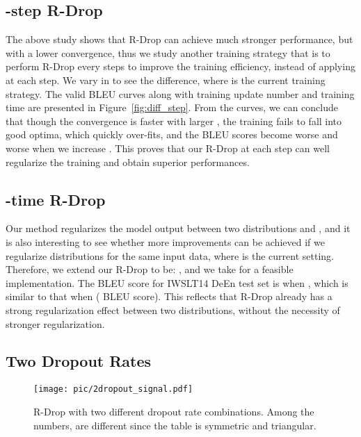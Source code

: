 \documentclass{article}
\begin{document}
\subsection{-step R-Drop}
The above study shows that R-Drop can achieve much stronger performance, but with a lower convergence, thus we study another training strategy that is to perform R-Drop every  steps to improve the training efficiency, instead of applying at each step. 
We vary  in  to see the difference, where  is the current training strategy. 
The valid BLEU curves along with training update number and training time are presented in Figure~\ref{fig:diff_step}. 
From the curves, we can conclude that though the convergence is faster with larger , the training fails to fall into good optima, which quickly over-fits, and the BLEU scores become worse and worse when we increase . 
This proves that our R-Drop at each step can well regularize the training and obtain superior performances. 




\subsection{-time R-Drop}

Our method regularizes the model output between two distributions  and , and it is also interesting to see whether more improvements can be achieved if we regularize  distributions for the same input data, where  is the current setting. Therefore, we extend our R-Drop to be:
{\small}, and we take  for a feasible implementation.
The BLEU score for IWSLT14 DeEn test set is  when , which is similar to that when  ( BLEU score). This reflects that R-Drop already has a strong regularization effect between two distributions, without the necessity of stronger regularization. 


\subsection{Two Dropout Rates}

\begin{wrapfigure}{r}{7cm}
\vspace{-0.6cm}
    \centering
    \texttt{[image: pic/2dropout\_signal.pdf]}
    \caption{R-Drop with two different dropout rate combinations. Among the  numbers,  are different since the table is symmetric and triangular.} 
    \label{fig:dropout2}
    \vspace{-0.4cm}
\end{wrapfigure}
\end{document}
